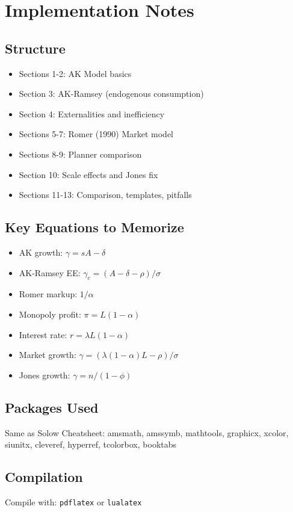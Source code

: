 \documentclass[a4paper,11pt]{article}
\begin{document}
\clearpage

\section{Implementation Notes}

\subsection*{Structure}
\begin{itemize}
    \item Sections 1-2: AK Model basics
    \item Section 3: AK-Ramsey (endogenous consumption)
    \item Section 4: Externalities and inefficiency
    \item Sections 5-7: Romer (1990) Market model
    \item Sections 8-9: Planner comparison
    \item Section 10: Scale effects and Jones fix
    \item Sections 11-13: Comparison, templates, pitfalls
\end{itemize}

\subsection*{Key Equations to Memorize}
\begin{itemize}
    \item AK growth: $\gamma = sA - \delta$
    \item AK-Ramsey EE: $\gamma_c = (A - \delta - \rho)/\sigma$
    \item Romer markup: $1/\alpha$
    \item Monopoly profit: $\pi = L(1-\alpha)$
    \item Interest rate: $r = \lambda L(1-\alpha)$
    \item Market growth: $\gamma = (\lambda(1-\alpha)L - \rho)/\sigma$
    \item Jones growth: $\gamma = n/(1-\phi)$
\end{itemize}

\subsection*{Packages Used}
Same as Solow Cheatsheet: amsmath, amssymb, mathtools, graphicx, xcolor, siunitx, cleveref, hyperref, tcolorbox, booktabs

\subsection*{Compilation}
Compile with: \texttt{pdflatex} or \texttt{lualatex}

\clearpage
\end{document}
